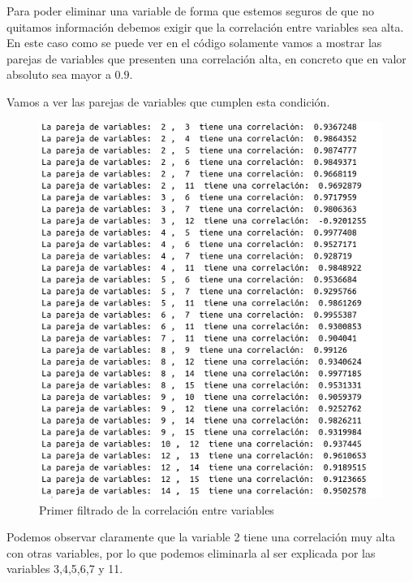 \documentclass[12pt,a4paper]{article}
\begin{document}
Para poder eliminar una variable de forma que estemos seguros de que no quitamos información debemos exigir que la correlación entre variables sea alta. En este caso como se puede ver en el código solamente vamos a mostrar las parejas de variables que presenten una correlación alta, en concreto que en valor absoluto sea mayor a $0.9$.

Vamos a ver las parejas de variables que cumplen esta condición.

\begin{figure}[H]
	\centering
	\includegraphics[scale=0.6]{./Imagenes/EDA/Regresion/correlacion_entre_variables1.png}
	\caption{Primer filtrado de la correlación entre variables}
\end{figure}

Podemos observar claramente que la variable 2 tiene una correlación muy alta con otras variables, por lo que podemos eliminarla al ser explicada por las variables 3,4,5,6,7 y 11.
\end{document}
